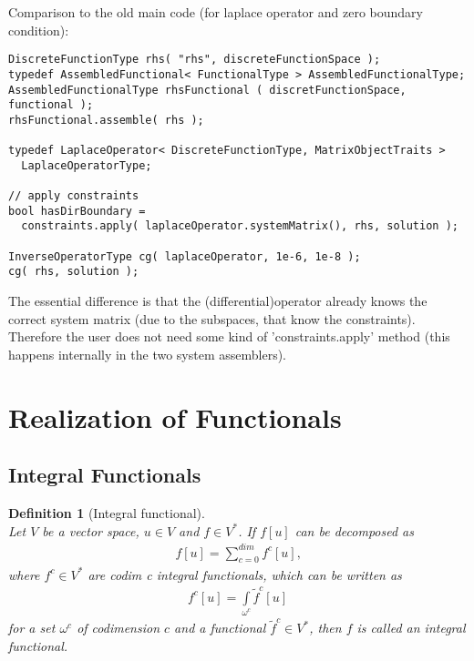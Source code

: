 \documentclass[a4paper,11pt]{article}
\numberwithin{equation}{section}
\newtheorem{definition}{Definition}[section]
\newcommand{\theoremNewline}{\hspace{1mm}\\}
\newcommand{\theoremEndLine}{\hspace{1mm}}
\newcommand{\komma}{\text{,}}
\begin{document}
Comparison to the old main code (for laplace operator and zero boundary condition):
\begin{lstlisting}
DiscreteFunctionType rhs( "rhs", discreteFunctionSpace );
typedef AssembledFunctional< FunctionalType > AssembledFunctionalType; 
AssembledFunctionalType rhsFunctional ( discretFunctionSpace, functional );
rhsFunctional.assemble( rhs );

typedef LaplaceOperator< DiscreteFunctionType, MatrixObjectTraits > 
  LaplaceOperatorType;

// apply constraints
bool hasDirBoundary = 
  constraints.apply( laplaceOperator.systemMatrix(), rhs, solution );

InverseOperatorType cg( laplaceOperator, 1e-6, 1e-8 );
cg( rhs, solution );
\end{lstlisting}

The essential difference is that the (differential)operator already knows the correct system matrix (due to the subspaces, that know the constraints). Therefore the user does not need some kind of 'constraints.apply' method (this happens internally in the two system assemblers).

\section{Realization of Functionals}

  \subsection{Integral Functionals}

    \begin{definition}[Integral functional]\theoremNewline
      Let $V$ be a vector space, ${u \in V}$ and ${f \in V^*}$. If $f[u]$ can
      be decomposed as
      \begin{align}
        f[u] = \sum\limits_{c = 0}^{dim}
            {
              f^c [u]
            }\komma
      \end{align}
      where ${f^c \in V^*}$ are \textnormal{codim c integral functionals}, which can be written as
      \begin{align}
        f^c [u] = \int\limits_{\omega^c} \tilde{f}^c[u]
      \end{align}
      for a set $\omega^c$ of codimension $c$ and a functional ${\tilde{f}^c \in V^*}$, then $f$ is called an
      \textnormal{integral functional}.
    \end{definition}\theoremEndLine
\end{document}
